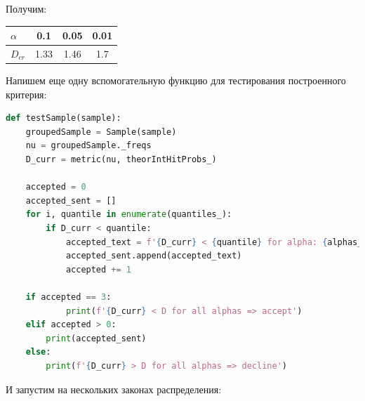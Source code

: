\documentclass[a4paper, 14pt]{extarticle}
\begin{document}
Получим:
\begin{table}[h!]
  \centering
  \renewcommand{\arraystretch}{1.5}
  \begin{tabular}{l|ccc}
  $\alpha$ & 0.1 & 0.05 & 0.01 \\
  \hline 
  $D_{cr}$ & 1.33 & 1.46 & 1.7
  \end{tabular}
\end{table}

Напишем еще одну вспомогательную функцию для тестирования построенного критерия:

\begin{center}
  \begin{lstlisting}[language=Python]
def testSample(sample):
    groupedSample = Sample(sample)
    nu = groupedSample._freqs
    D_curr = metric(nu, theorIntHitProbs_)

    accepted = 0
    accepted_sent = []
    for i, quantile in enumerate(quantiles_):
        if D_curr < quantile:
            accepted_text = f'{D_curr} < {quantile} for alpha: {alphas_[i]} => accept(alpha={alphas_[i]})\n'
            accepted_sent.append(accepted_text)
            accepted += 1

    if accepted == 3:
            print(f'{D_curr} < D for all alphas => accept')
    elif accepted > 0:
        print(accepted_sent)
    else:
        print(f'{D_curr} > D for all alphas => decline')
  \end{lstlisting}
\end{center}

\newpage

И запустим на нескольких законах распределения:
\end{document}
